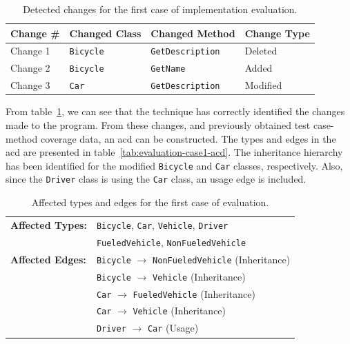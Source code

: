 \documentclass[a4paper,english,12pt]{report}
\newcommand{\textcf}{\texttt}
\begin{document}
\begin{table}[htbp]
  \centering
  \begin{tabular}{|l|l|l|l|}
    \hline
    \textbf{Change \#} & \textbf{Changed Class} & \textbf{Changed Method} & \textbf{Change Type}\\
    \hline
    Change 1 & \textcf{Bicycle} & \textcf{GetDescription} & Deleted\\
    \hline
    Change 2 & \textcf{Bicycle} & \textcf{GetName} & Added\\
    \hline
    Change 3 & \textcf{Car} & \textcf{GetDescription} & Modified\\
    \hline
  \end{tabular}
  \caption{Detected changes for the first case of implementation evaluation.}
  \label{tab:evaluation-case1-diffs}
\end{table}

From table~\ref{tab:evaluation-case1-diffs}, we can see that the technique has correctly identified the changes made to the program. From these changes, and previously obtained test case-method coverage data, an \gls{acd} can be constructed. The types and edges in the \gls{acd} are presented in table~\vref{tab:evaluation-case1-acd}. The inheritance hierarchy has been identified for the modified \textcf{Bicycle} and \textcf{Car} classes, respectively. Also, since the \textcf{Driver} class is using the \textcf{Car} class, an usage edge is included.

\begin{table}[htbp]
  \centering
  \begin{tabular}{|l|l|}
    \hline
    \textbf{Affected Types:} & \textcf{Bicycle}, \textcf{Car}, \textcf{Vehicle}, \textcf{Driver}\\
                    & \textcf{FueledVehicle}, \textcf{NonFueledVehicle}\\
    \hline
    \textbf{Affected Edges:} & \textcf{Bicycle} $\to$ \textcf{NonFueledVehicle} (Inheritance)\\
                    & \textcf{Bicycle} $\to$ \textcf{Vehicle} (Inheritance)\\
                    & \textcf{Car} $\to$ \textcf{FueledVehicle} (Inheritance)\\
                    & \textcf{Car} $\to$ \textcf{Vehicle} (Inheritance)\\
                    & \textcf{Driver} $\to$ \textcf{Car} (Usage)\\
    \hline
  \end{tabular}
  \caption{Affected types and edges for the first case of evaluation.}
  \label{tab:evaluation-case1-acd}
\end{table}
\end{document}
